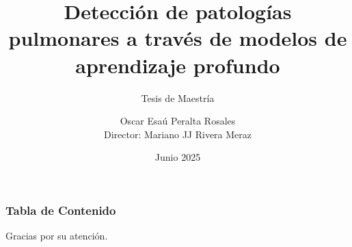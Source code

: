 \documentclass{beamer}
\title[Detección de patologías pulmonares]{Detección de patologías pulmonares a través de modelos de aprendizaje profundo}
\subtitle{Tesis de Maestría}
\author[Oscar Esaú Peralta]{Oscar Esaú Peralta Rosales\\Director: Mariano JJ Rivera Meraz}
\institute[CIMAT]{Centro de Investigación en Matemáticas A.C.}
\date{Junio 2025}
\begin{document}
\frame{\titlepage}

\begin{frame}
\frametitle{Tabla de Contenido}
\tableofcontents
\end{frame}






















\begin{frame}
\begin{center}
    Gracias por su atención.
\end{center}
\end{frame}
\end{document}
